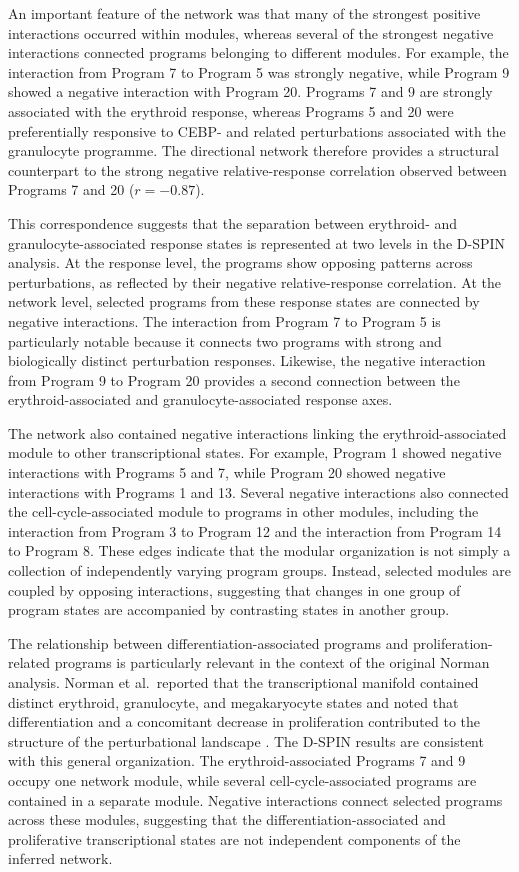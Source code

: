 \documentclass[11pt,a4paper]{article}
\begin{document}
An important feature of the network was that many of the strongest positive interactions occurred within modules, whereas several of the strongest negative interactions connected programs belonging to different modules. For example, the interaction from Program 7 to Program 5 was strongly negative, while Program 9 showed a negative interaction with Program 20. Programs 7 and 9 are strongly associated with the erythroid response, whereas Programs 5 and 20 were preferentially responsive to CEBP- and related perturbations associated with the granulocyte programme. The directional network therefore provides a structural counterpart to the strong negative relative-response correlation observed between Programs 7 and 20 ($r=-0.87$).

This correspondence suggests that the separation between erythroid- and granulocyte-associated response states is represented at two levels in the D-SPIN analysis. At the response level, the programs show opposing patterns across perturbations, as reflected by their negative relative-response correlation. At the network level, selected programs from these response states are connected by negative interactions. The interaction from Program 7 to Program 5 is particularly notable because it connects two programs with strong and biologically distinct perturbation responses. Likewise, the negative interaction from Program 9 to Program 20 provides a second connection between the erythroid-associated and granulocyte-associated response axes.

The network also contained negative interactions linking the erythroid-associated module to other transcriptional states. For example, Program 1 showed negative interactions with Programs 5 and 7, while Program 20 showed negative interactions with Programs 1 and 13. Several negative interactions also connected the cell-cycle-associated module to programs in other modules, including the interaction from Program 3 to Program 12 and the interaction from Program 14 to Program 8. These edges indicate that the modular organization is not simply a collection of independently varying program groups. Instead, selected modules are coupled by opposing interactions, suggesting that changes in one group of program states are accompanied by contrasting states in another group.

The relationship between differentiation-associated programs and proliferation-related programs is particularly relevant in the context of the original Norman analysis. Norman et al.~reported that the transcriptional manifold contained distinct erythroid, granulocyte, and megakaryocyte states and noted that differentiation and a concomitant decrease in proliferation contributed to the structure of the perturbational landscape \citep{Norman2019}. The D-SPIN results are consistent with this general organization. The erythroid-associated Programs 7 and 9 occupy one network module, while several cell-cycle-associated programs are contained in a separate module. Negative interactions connect selected programs across these modules, suggesting that the differentiation-associated and proliferative transcriptional states are not independent components of the inferred network.
\end{document}
